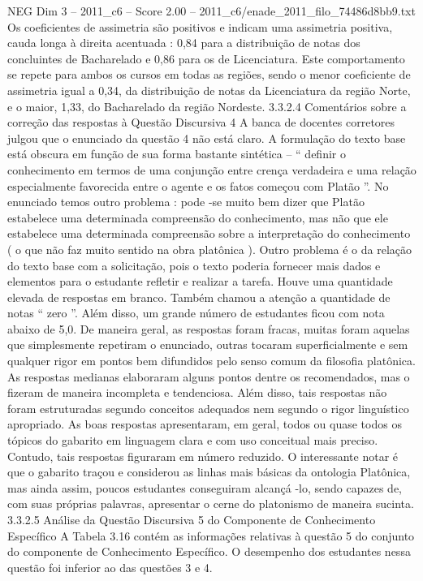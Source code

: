 \begin{textsample}{NEG Dim 3 – 2011\_c6 – Score 2.00 – 2011\_c6/enade\_2011\_filo\_74486d8bb9.txt}
Os coeficientes de assimetria são positivos e indicam uma assimetria positiva, cauda longa à direita acentuada : 0,84 para a distribuição de notas dos concluintes de Bacharelado e 0,86 para os de Licenciatura.
Este comportamento se repete para ambos os cursos em todas as regiões, sendo o menor coeficiente de assimetria igual a 0,34, da distribuição de notas da Licenciatura da região Norte, e o maior, 1,33, do Bacharelado da região Nordeste. 3.3.2.4 Comentários sobre a correção das respostas à Questão Discursiva 4 A banca de docentes corretores julgou que o enunciado da questão 4 não está claro.
A formulação do texto base está obscura em função de sua forma bastante sintética – “ definir o conhecimento em termos de uma conjunção entre crença verdadeira e uma relação especialmente favorecida entre o agente e os fatos começou com Platão ”.
No enunciado temos outro problema : pode -se muito bem dizer que Platão estabelece uma determinada compreensão do conhecimento, mas não que ele estabelece uma determinada compreensão sobre a interpretação do conhecimento ( o que não faz muito sentido na obra platônica ).
Outro problema é o da relação do texto base com a solicitação, pois o texto poderia fornecer mais dados e elementos para o estudante refletir e realizar a tarefa.
Houve uma quantidade elevada de respostas em branco.
Também chamou a atenção a quantidade de notas “ zero ”.
Além disso, um grande número de estudantes ficou com nota abaixo de 5,0.
De maneira geral, as respostas foram fracas, muitas foram aquelas que simplesmente repetiram o enunciado, outras tocaram superficialmente e sem qualquer rigor em pontos bem difundidos pelo senso comum da filosofia platônica.
As respostas medianas elaboraram alguns pontos dentre os recomendados, mas o fizeram de maneira incompleta e tendenciosa.
Além disso, tais respostas não foram estruturadas segundo conceitos adequados nem segundo o rigor linguístico apropriado.
As boas respostas apresentaram, em geral, todos ou quase todos os tópicos do gabarito em linguagem clara e com uso conceitual mais preciso.
Contudo, tais respostas figuraram em número reduzido.
O interessante notar é que o gabarito traçou e considerou as linhas mais básicas da ontologia Platônica, mas ainda assim, poucos estudantes conseguiram alcançá -lo, sendo capazes de, com suas próprias palavras, apresentar o cerne do platonismo de maneira sucinta. 3.3.2.5 Análise da Questão Discursiva 5 do Componente de Conhecimento Específico A Tabela 3.16 contém as informações relativas à questão 5 do conjunto do componente de Conhecimento Específico.
O desempenho dos estudantes nessa questão foi inferior ao das questões 3 e 4.

\end{textsample}
